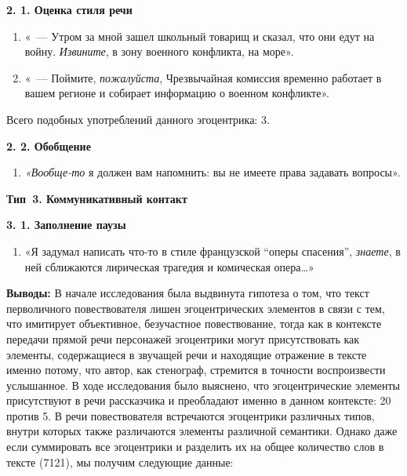 \documentclass{kursa4}
\begin{document}
{      \textbf{2. 1. Оценка стиля речи}
        \setcounter{saveenum}{\value{enumi}}
        \begin{enumerate}
        \setcounter{enumi}{\value{saveenum}}
        \item «~--- Утром за мной зашел школьный товарищ и сказал, что они едут на войну. \textit{Извините}, в зону военного конфликта, на море». 
        \item «~--- Поймите, \textit{пожалуйста}, Чрезвычайная комиссия временно работает в вашем регионе и собирает информацию о военном конфликте».
      \end{enumerate}

      Всего подобных употреблений данного эгоцентрика: 3.

      \textbf{2. 2. Обобщение}
      \setcounter{saveenum}{\value{enumi}}
        \begin{enumerate}
        \setcounter{enumi}{\value{saveenum}}
        \item \textit{«Вообще-то} я должен вам напомнить: вы не имеете права
        задавать вопросы».
      \end{enumerate}
      {\centering
      \textbf{Тип~3. Коммуникативный контакт }
      \par}

      \textbf{3. 1. Заполнение паузы}

      \setcounter{saveenum}{\value{enumi}}
        \begin{enumerate}
        \setcounter{enumi}{\value{saveenum}}
        \item «Я задумал написать что-то в стиле французской “оперы спасения”,
        \textit{знаете}, в ней сближаются лирическая трагедия и комическая
        опера…»
      \end{enumerate}

      \textbf{Выводы:}{
      В начале исследования была выдвинута гипотеза о том, что текст перволичного повествователя лишен эгоцентрических элементов в связи с тем, что имитирует объективное, безучастное повествование, тогда как в контексте передачи прямой речи персонажей эгоцентрики могут присутствовать как элементы, содержащиеся в звучащей речи и находящие отражение в тексте именно потому, что автор, как стенограф, стремится в точности воспроизвести услышанное. В ходе исследования было выяснено, что эгоцентрические элементы присутствуют в речи рассказчика и преобладают именно в данном контексте: 20 против 5. В речи повествователя встречаются эгоцентрики различных типов, внутри которых также различаются элементы различной семантики. Однако даже если суммировать все эгоцентрики и разделить их на общее количество слов в тексте (7121), мы получим следующие данные:}

}
\end{document}
